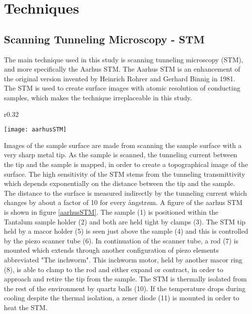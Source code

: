 \chapter{Techniques}
\label{techniques}

\section{Scanning Tunneling Microscopy - STM}

The main technique used in this study is scanning tunneling microscopy (STM), and more specifically the Aarhus STM. The Aarhus STM is an enhancement of the original version invented by Heinrich Rohrer and Gerhard Binnig in 1981.\cite{aarhusSTM} The STM is used to create surface images with atomic resolution of conducting samples, which makes the technique irreplaceable in this study.\\
\begin{wrapfigure}{r}{0.32\textwidth}
  \begin{center}
    \texttt{[image: aarhusSTM]}
  \end{center}
  \caption{Schematic of the aarhus STM. \cite{aarhusSTM}}
  \label{aarhusSTM}
\end{wrapfigure}
Images of the sample surface are made from scanning the sample surface with a very sharp metal tip. As the sample is scanned, the tunneling current between the tip and the sample is mapped, in order to create a topographical image of the surface. The high sensitivity of the STM stems from the tunneling transmittivity which depends exponentially on the distance between the tip and the sample. The distance to the surface is measured indirectly by the tunneling current which changes by about a factor of 10 for every ångstrøm.\cite{STMbinnig} A figure of the aarhus STM is shown in figure \ref{aarhusSTM}. The sample (1) is positioned within the Tantalum sample holder (2) and both are held tight by clamps (3). The STM tip held by a macor holder (5) is seen just above the sample (4) and this is controlled by the piezo scanner tube (6). In continuation of the scanner tube, a rod (7) is mounted which extends through another configuration of piezo elements abbreviated "The inchworm". This inchworm motor, held by another macor ring (8), is able to clamp to the rod and either expand or contract, in order to approach and retire the tip from the sample. The STM is thermally isolated from the rest of the environment by quartz balls (10). If the temperature drops during cooling despite the thermal isolation,  a zener diode (11) is mounted in order to heat the STM.\\
